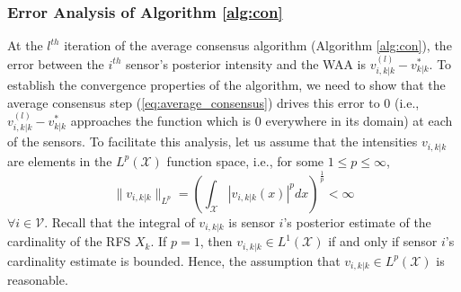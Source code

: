 \subsubsection{Error Analysis of Algorithm \ref{alg:con}}
\label{sec:subsec_error_analysis}
At the $l^{th}$ iteration of the average consensus algorithm (Algorithm \ref{alg:con}),
the error between the $i^{th}$ sensor's posterior intensity and the WAA is $v^{(l)}_{i,k|k}-v^*_{k|k}$. To establish the convergence properties of the algorithm, we need to show that the average consensus step (\ref{eq:average_consensus}) drives this error to $0$ (i.e., $v^{(l)}_{i,k|k}-v^*_{k|k}$ approaches the function which is $0$ everywhere in its domain) at each of the sensors.
To facilitate this analysis, let us assume that the intensities $v_{i,k|k}$ are elements in the $L^p(\mathcal X)$ function space, i.e., for some $1\leq p\leq \infty$,
\begin{equation}
\|v_{i,k|k}\|_{L^p} =  \left(\int_\mathcal X |v_{i,k|k}(x)|^p dx\right)^{\frac{1}{p}}< \infty
\end{equation}
$\forall i\in \mathcal V$. Recall that the integral of $v_{i,k|k}$ is sensor $i$'s posterior estimate of the cardinality of the RFS $X_k$. If $p=1$, then $v_{i,k|k}\in L^1(\mathcal X)$ if and only if sensor $i$'s cardinality estimate is bounded. Hence, the assumption that $v_{i,k|k}\in L^p(\mathcal X)$  is reasonable.

